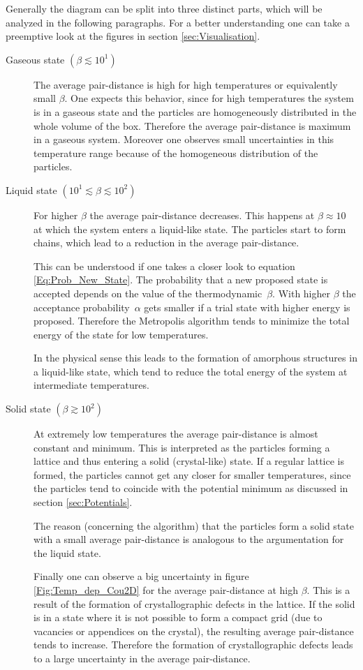 \documentclass[11pt, a4paper]{article}
\numberwithin{equation}{section}
\begin{document}
Generally the diagram can be split into three distinct parts, which will be analyzed in the following paragraphs.
For a better understanding one can take a preemptive look at the figures in section \ref{sec:Visualisation}.
\begin{description}
	\item[Gaseous state $(\beta \lesssim 10^1)$] 
		The average pair-distance is high for high temperatures or equivalently small $\beta$.
		One expects this behavior, since for high temperatures the system is in a gaseous state and the particles are homogeneously distributed in the whole volume of the box.
		Therefore the average pair-distance is maximum in a gaseous system.
		Moreover one observes small uncertainties in this temperature range because of the homogeneous distribution of the particles.
	
	\item[Liquid state $(10^1 \lesssim \beta \lesssim 10^2)$]
		For higher $\beta$ the average pair-distance decreases.
		This happens at $\beta \approx 10$ at which the system enters a liquid-like state.
		The particles start to form chains, which lead to a reduction in the average pair-distance.
		
		This can be understood if one takes a closer look to equation \ref{Eq:Prob_New_State}.
		The probability that a new proposed state is accepted depends on the value of the thermodynamic~$\beta$.
		With higher $\beta$ the acceptance probability~$\alpha$ gets smaller if a trial state with higher energy is proposed.
		Therefore the Metropolis algorithm tends to minimize the total energy of the state for low temperatures.
		
		In the physical sense this leads to the formation of amorphous structures in a liquid-like state, which tend to reduce the total energy of the system at intermediate temperatures.		
		
	\item[Solid state $(\beta \gtrsim 10^2)$]
		At extremely low temperatures the average pair-distance is almost constant and minimum.
		This is interpreted as the particles forming a lattice and thus entering a solid (crystal-like) state.
		If a regular lattice is formed, the particles cannot get any closer for smaller temperatures, since the particles tend to coincide with the potential minimum as discussed in section \ref{sec:Potentials}.
		
		The reason (concerning the algorithm) that the particles form a solid state with a small average pair-distance is analogous to the argumentation for the liquid state.
		
		Finally one can observe a big uncertainty in figure \ref{Fig:Temp_dep_Cou2D} for the average pair-distance at high $\beta$.
		This is a result of the formation of crystallographic defects in the lattice.
		If the solid is in a state where it is not possible to form a compact grid (due to vacancies or appendices on the crystal), the resulting average pair-distance tends to increase.
		Therefore the formation of crystallographic defects leads to a large uncertainty in the average pair-distance.
\end{description}
\end{document}
